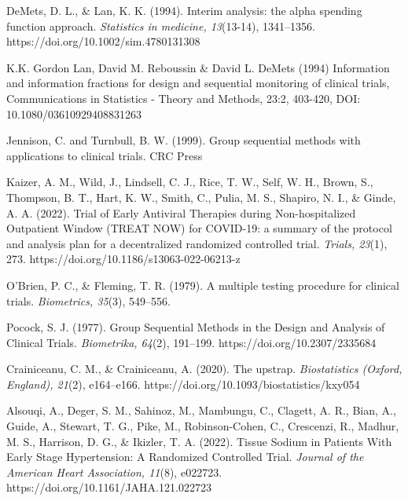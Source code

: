 \documentclass[Afour,sageh,times,square,numbers]{sagej}
\begin{document}
\begin{thebibliography}{99}
DeMets, D. L., \& Lan, K. K. (1994). Interim analysis: the alpha spending function approach. \textit{Statistics in medicine, 13}(13-14), 1341–1356. https://doi.org/10.1002/sim.4780131308

K.K. Gordon Lan, David M. Reboussin \& David L. DeMets (1994) Information and information fractions for design and sequential monitoring of clinical trials, Communications in Statistics - Theory and Methods, 23:2, 403-420, DOI: 10.1080/03610929408831263

Jennison, C. and Turnbull, B. W. (1999). Group sequential methods with applications to
clinical trials. CRC Press

Kaizer, A. M., Wild, J., Lindsell, C. J., Rice, T. W., Self, W. H., Brown, S., Thompson, B. T., Hart, K. W., Smith, C., Pulia, M. S., Shapiro, N. I., \& Ginde, A. A. (2022). Trial of Early Antiviral Therapies during Non-hospitalized Outpatient Window (TREAT NOW) for COVID-19: a summary of the protocol and analysis plan for a decentralized randomized controlled trial. \textit{Trials, 23}(1), 273. https://doi.org/10.1186/s13063-022-06213-z

O'Brien, P. C., \& Fleming, T. R. (1979). A multiple testing procedure for clinical trials. \textit{Biometrics, 35}(3), 549–556.

Pocock, S. J. (1977). Group Sequential Methods in the Design and Analysis of Clinical Trials. \textit{Biometrika, 64}(2), 191–199. https://doi.org/10.2307/2335684

Crainiceanu, C. M., \& Crainiceanu, A. (2020). The upstrap. \textit{Biostatistics (Oxford, England), 21}(2), e164–e166. https://doi.org/10.1093/biostatistics/kxy054

Alsouqi, A., Deger, S. M., Sahinoz, M., Mambungu, C., Clagett, A. R., Bian, A., Guide, A., Stewart, T. G., Pike, M., Robinson-Cohen, C., Crescenzi, R., Madhur, M. S., Harrison, D. G., \& Ikizler, T. A. (2022). Tissue Sodium in Patients With Early Stage Hypertension: A Randomized Controlled Trial. \textit{Journal of the American Heart Association, 11}(8), e022723. https://doi.org/10.1161/JAHA.121.022723

\end{thebibliography}
\end{document}
